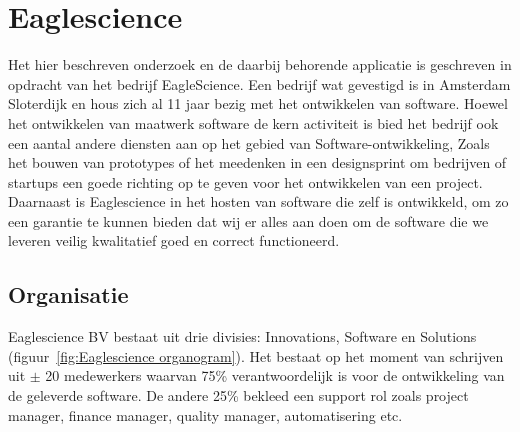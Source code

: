 \chapter{Eaglescience}\label{ch:eaglescience} %

\label{ch:Eaglescience} %

Het hier beschreven onderzoek en de daarbij behorende applicatie is geschreven in opdracht van het bedrijf EagleScience. Een bedrijf wat gevestigd is in Amsterdam Sloterdijk en hous zich al 11 jaar bezig met het ontwikkelen van software. Hoewel het ontwikkelen van maatwerk software de kern activiteit is bied het bedrijf ook een aantal andere diensten aan op het gebied van Software-ontwikkeling, Zoals het bouwen van prototypes of het meedenken in een designsprint om bedrijven of startups een goede richting op te geven voor het ontwikkelen van een project. Daarnaast is Eaglescience in het hosten van software die zelf is ontwikkeld, om zo een garantie te kunnen bieden dat wij er alles aan doen om de software die we leveren veilig kwalitatief goed en correct functioneerd.



\section{Organisatie}\label{sec:organisatie}

Eaglescience BV bestaat uit drie divisies: Innovations, Software en Solutions (figuur~\ref{fig:Eaglescience organogram}). Het bestaat op het moment van schrijven uit $\pm$ 20 medewerkers waarvan 75\% verantwoordelijk is voor de ontwikkeling van de geleverde software. De andere 25\% bekleed een support rol zoals project manager, finance manager, quality manager, automatisering etc.

